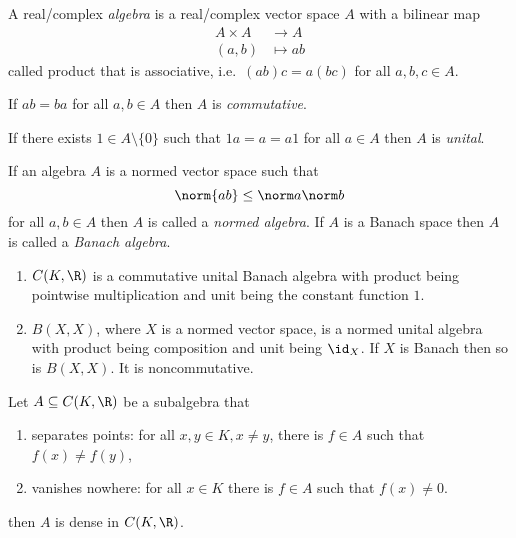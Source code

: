 \documentclass[a4paper]{article}
\begin{document}
\begin{definition}[algebra]
  A real/complex \emph{algebra} is a real/complex vector space \(A\) with a bilinear map
  \begin{align*}
    A \times A &\to A \\
    (a, b) &\mapsto ab
  \end{align*}
  called product that is associative, i.e.\ \((ab)c = a(bc)\) for all \(a, b,c \in A\).

  If \(ab = ba\) for all \(a, b \in A\) then \(A\) is \emph{commutative}.

  If there exists \(1 \in A \setminus \{0\}\) such that \(1a = a = a1\) for all \(a \in A\) then \(A\) is \emph{unital}.
\end{definition}

\begin{definition}
  If an algebra \(A\) is a normed vector space such that
  \[
    \norm{ab} \leq \norm a \norm b
  \]
  for all \(a, b \in A\) then \(A\) is called a \emph{normed algebra}. If \(A\) is a Banach space then \(A\) is called a \emph{Banach algebra}.
\end{definition}

\begin{eg}\leavevmode
  \begin{enumerate}
  \item \(C(K, \R)\) is a commutative unital Banach algebra with product being pointwise multiplication and unit being the constant function \(1\).
  \item \(B(X, X)\), where \(X\) is a normed vector space, is a normed unital algebra with product being composition and unit being \(\id_X\). If \(X\) is Banach then so is \(B(X, X)\). It is noncommutative.
  \end{enumerate}
\end{eg}

\begin{theorem}
  \label{thm:Stone-Weierstrass}
  Let \(A \subseteq C(K, \R)\) be a subalgebra that
  \begin{enumerate}
  \item separates points: for all \(x, y \in K, x \neq y\), there is \(f \in A\) such that \(f(x) \neq f(y)\),
  \item vanishes nowhere: for all \(x \in K\) there is \(f \in A\) such that \(f(x) \neq 0\).
  \end{enumerate}
  then \(A\) is dense in \(C(K, \R)\).
\end{theorem}
\end{document}
